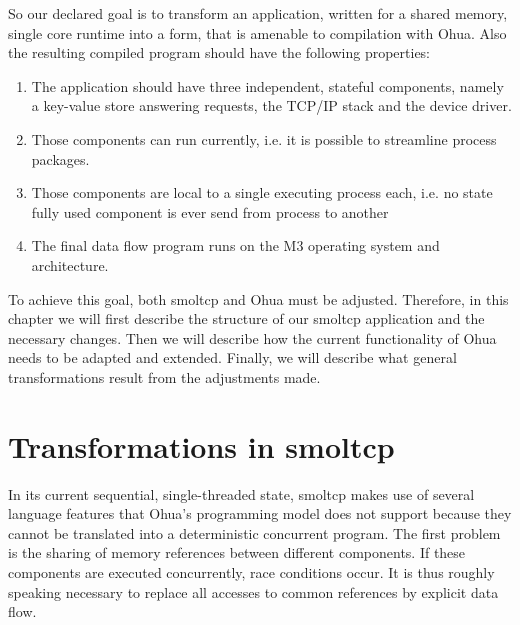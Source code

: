 So our declared goal is to transform an application, written for a shared memory, single core runtime into a form, that is amenable to compilation with Ohua. Also the resulting compiled program should have the following properties:
\begin{enumerate}
    \item The application should have three independent, stateful components, namely a key-value store answering requests, the TCP/IP stack and the device driver. 
    \item Those components can run currently, i.e. it is possible to streamline process packages.
    \item Those components are local to a single executing process each, i.e. no state fully used component is ever send from process to another
    \item The final data flow program runs on the M3 operating system and architecture.
\end{enumerate}

To achieve this goal, both smoltcp and Ohua must be adjusted. Therefore, in this chapter we will first describe the structure of our smoltcp application and the necessary changes. Then we will describe how the current functionality of Ohua needs to be adapted and extended. Finally, we will describe what general transformations result from the adjustments made. 

\section{Transformations in smoltcp}
\label{sec:ImplSmoltcp}

In its current sequential, single-threaded state, smoltcp makes use of several language features that Ohua's programming model does not support because they cannot be translated into a deterministic concurrent program. The first problem is the sharing of memory references between different components. If these components are executed concurrently, race conditions occur. It is thus roughly speaking necessary to replace all accesses to common references by explicit data flow. 

